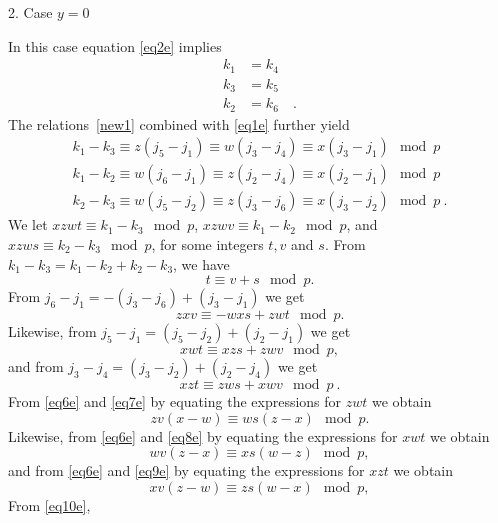  2. Case $y=0$

In this case equation \eqref{eq2e} implies
\begin{equation}\label{new1}\begin{array}{ccc}
k_1 &= k_4& \\
k_3 &= k_5& \\
k_2 &= k_6&~.
\end{array}\end{equation}
The relations~\eqref{new1} combined with \eqref{eq1e} further yield
\begin{equation}\begin{array}{ccc}
k_1 -k_3 \equiv z(j_5-j_1) \equiv w(j_3-j_4) \equiv x(j_3-j_1)
\mod p\\
k_1 -k_2 \equiv w(j_6-j_1) \equiv z(j_2-j_4) \equiv x(j_2-j_1)
\mod p\\
k_2 -k_3 \equiv w(j_5-j_2) \equiv z(j_3-j_6) \equiv x(j_3-j_2) \mod
p~.
\end{array}\end{equation}
We let $xzwt \equiv k_1-k_3 \mod p$, $xzwv \equiv k_1-k_2 \mod p$,
and $xzws \equiv k_2-k_3 \mod p$, for some integers $t,v$ and $s$.
From $k_1-k_3=k_1-k_2+k_2-k_3$, we have
\begin{equation}\label{eq6e}
t \equiv v+s \mod p.
\end{equation}
From $j_6-j_1=-(j_3-j_6)+(j_3-j_1)$ we get
\begin{equation}\label{eq7e}
zxv \equiv -wxs+zwt \mod p.
\end{equation}
Likewise, from $j_5-j_1=(j_5-j_2)+(j_2-j_1)$ we get
\begin{equation}\label{eq8e}
xwt \equiv xzs+zwv \mod p,
\end{equation}
and from $j_3-j_4=(j_3-j_2)+(j_2-j_4)$ we get
\begin{equation}\label{eq9e}
xzt \equiv zws+xwv \mod p~.
\end{equation}
From \eqref{eq6e} and \eqref{eq7e} by equating the expressions for
$zwt$ we obtain
\begin{equation}\label{eq10e}
zv(x-w) \equiv ws(z-x) \mod p.
\end{equation}
Likewise, from \eqref{eq6e} and \eqref{eq8e} by equating the
expressions for $xwt$ we obtain
\begin{equation}\label{eq11e}
wv(z-x) \equiv xs(w-z) \mod p, \end{equation} and from \eqref{eq6e}
and \eqref{eq9e} by equating the expressions for $xzt$ we obtain
\begin{equation}\label{eq12e}
xv(z-w) \equiv zs(w-x) \mod p, \end{equation} From \eqref{eq10e},
